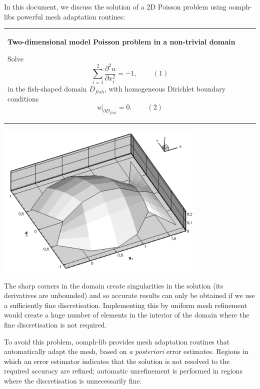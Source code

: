 In this document, we discuss the solution of a 2D Poisson problem using {\ttfamily oomph-\/lib\textquotesingle{}s} powerful mesh adaptation routines\+:

\begin{center} \tabulinesep=1mm
\begin{longtabu} spread 0pt [c]{*{1}{|X[-1]}|}
\hline
\begin{center} {\bfseries Two-\/dimensional model Poisson problem in a non-\/trivial domain} \end{center}  Solve \[ \sum_{i=1}^2 \frac{\partial^2u}{\partial x_i^2} = -1, \ \ \ \ \ \ \ \ \ \ (1) \] in the fish-\/shaped domain $D_{fish} $, with homogeneous Dirichlet boundary conditions \[ \left. u\right|_{\partial D_{fish}}=0. \ \ \ \ \ \ \ \ \ \ (2) \]   \\
\end{longtabu}
\end{center} 

 
\begin{DoxyImage}
\includegraphics[width=0.75\textwidth]{fish_poisson_soln}
\end{DoxyImage}


The sharp corners in the domain create singularities in the solution (its derivatives are unbounded) and so accurate results can only be obtained if we use a sufficiently fine discretisation. Implementing this by uniform mesh refinement would create a huge number of elements in the interior of the domain where the fine discretisation is not required.

To avoid this problem, {\ttfamily oomph-\/lib} provides mesh adaptation routines that automatically adapt the mesh, based on {\itshape a} {\itshape posteriori} error estimates. Regions in which an error estimator indicates that the solution is not resolved to the required accuracy are refined; automatic unrefinement is performed in regions where the discretisation is unnecessarily fine.

